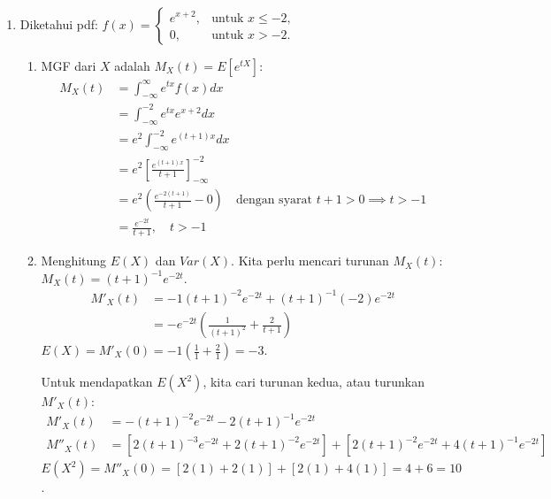 \documentclass[11pt,letterpaper]{article}
\begin{document}
\begin{enumerate}
  \item Diketahui pdf: $f(x) = \begin{cases} e^{x+2}, & \text{untuk } x \le -2, \\ 0, & \text{untuk } x > -2. \end{cases}$
        \begin{enumerate}[label=\alph*.]
          \item MGF dari $X$ adalah $M_X(t) = E[e^{tX}]$:
                \begin{align*}
                  M_X(t) & = \int_{-\infty}^{\infty} e^{tx} f(x) dx                                                             \\
                         & = \int_{-\infty}^{-2} e^{tx} e^{x+2} dx                                                              \\
                         & = e^2 \int_{-\infty}^{-2} e^{(t+1)x} dx                                                              \\
                         & = e^2 \left[ \frac{e^{(t+1)x}}{t+1} \right]_{-\infty}^{-2}                                           \\
                         & = e^2 \left( \frac{e^{-2(t+1)}}{t+1} - 0 \right) \quad \text{dengan syarat } t+1 > 0 \implies t > -1 \\
                         & = \frac{e^{-2t}}{t+1}, \quad t > -1
                \end{align*}
          \item Menghitung $E(X)$ dan $Var(X)$. Kita perlu mencari turunan $M_X(t)$: \\
                $M_X(t) = (t+1)^{-1} e^{-2t}$. \\
                \begin{align*}
                  M'_X(t) & = -1(t+1)^{-2}e^{-2t} + (t+1)^{-1}(-2)e^{-2t}               \\
                          & = -e^{-2t} \left( \frac{1}{(t+1)^2} + \frac{2}{t+1} \right)
                \end{align*}
                $E(X) = M'_X(0) = -1 \left( \frac{1}{1} + \frac{2}{1} \right) = -3$.

                Untuk mendapatkan $E(X^2)$, kita cari turunan kedua, atau turunkan $M'_X(t)$:
                \begin{align*}
                  M'_X(t)  & = - (t+1)^{-2} e^{-2t} - 2(t+1)^{-1} e^{-2t}                                                                      \\
                  M''_X(t) & = \left[ 2(t+1)^{-3}e^{-2t} + 2(t+1)^{-2}e^{-2t} \right] + \left[ 2(t+1)^{-2}e^{-2t} + 4(t+1)^{-1}e^{-2t} \right]
                \end{align*}
                $E(X^2) = M''_X(0) = [ 2(1) + 2(1) ] + [ 2(1) + 4(1) ] = 4 + 6 = 10$.


\end{enumerate}
\end{enumerate}
\end{document}
